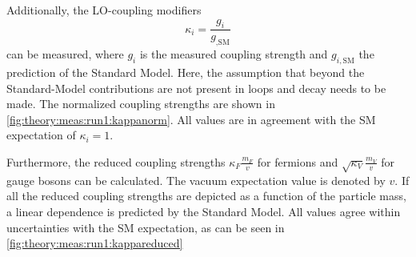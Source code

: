 Additionally, the LO-coupling modifiers
\begin{equation}
    \kappa_i = \frac{g_i}{g_{,\text{SM}}}
\end{equation}
can be measured, where $g_i$ is the measured coupling strength and $g_{i,\text{SM}}$ the prediction of the Standard Model.
Here, the assumption that beyond the Standard-Model contributions are not present in loops and decay needs to be made.
The normalized coupling strengths are shown in \cref{fig:theory:meas:run1:kappanorm}.
All values are in agreement with the SM expectation of $\kappa_i = 1$.

Furthermore, the reduced coupling strengths $\kappa_F \frac{m_F}{v}$ for fermions and $\sqrt{\kappa_V} \frac{m_V}{v}$ for gauge bosons
can be calculated.
The vacuum expectation value is denoted by $v$.
If all the reduced coupling strengths are depicted as a function of the particle mass, a linear dependence is predicted by the Standard Model.
All values agree within uncertainties with the SM expectation, as can be seen  in \cref{fig:theory:meas:run1:kappareduced}~\

